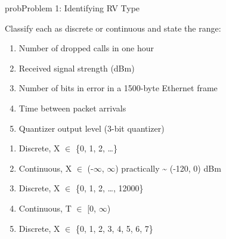 
\begin{PSbox}[unbreakable]{prob}{Problem 1: Identifying RV Type}

Classify each as discrete or continuous and state the range:

\begin{enumerate}
\def\labelenumi{(\alph{enumi})}
\tightlist
\item
  Number of dropped calls in one hour
\item
  Received signal strength (dBm)
\item
  Number of bits in error in a 1500-byte Ethernet frame
\item
  Time between packet arrivals
\item
  Quantizer output level (3-bit quantizer)
\end{enumerate}

\PSsolution{} 

\begin{enumerate}
\def\labelenumi{(\alph{enumi})}
\tightlist
\item
  Discrete, X \ensuremath{\in} \{0, 1, 2, …\}
\item
  Continuous, X \ensuremath{\in} (-\ensuremath{\infty}, \ensuremath{\infty}) practically \textasciitilde{} (-120, 0) dBm
\item
  Discrete, X \ensuremath{\in} \{0, 1, 2, …, 12000\}
\item
  Continuous, T \ensuremath{\in} [0, \ensuremath{\infty})
\item
  Discrete, X \ensuremath{\in} \{0, 1, 2, 3, 4, 5, 6, 7\}
\end{enumerate}

\end{PSbox}

